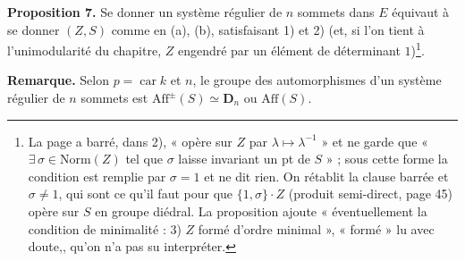 \documentclass[11pt,a4paper]{article}
\begin{document}
\textbf{Proposition 7.} Se donner un système régulier de $n$ sommets dans $E$
équivaut à se donner $(Z, S)$ comme en (a), (b), satisfaisant 1) et 2)
(et, si l'on tient à l'unimodularité du chapitre, $Z$ engendré par un élément
de déterminant $1$)\footnote{La page a barré, dans 2), « opère sur $Z$ par
$\lambda \mapsto \lambda^{-1}$ » et ne garde que « $\exists\, \sigma \in
\mathrm{Norm}(Z)$ tel que $\sigma$ laisse invariant un pt de $S$ » ; sous
cette forme la condition est remplie par $\sigma = 1$ et ne dit rien. On
rétablit la clause barrée et $\sigma \neq 1$, qui sont ce qu'il faut pour que
$\{1, \sigma\} \cdot Z$ (produit semi-direct, page 45) opère sur $S$ en
groupe diédral. La proposition ajoute « éventuellement la condition de
minimalité : 3) $Z$ formé d'ordre minimal », « formé » lu avec doute,, qu'on n'a pas su
interpréter.}.

\textbf{Remarque.} Selon $p = \operatorname{car} k$ et $n$, le groupe des
automorphismes d'un système régulier de $n$ sommets est $\mathrm{Aff}^{\pm}(S)
\simeq \mathbf{D}_n$ ou $\mathrm{Aff}(S)$.
\end{document}
